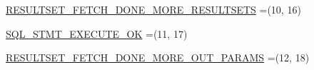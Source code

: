 \begin{DoxyCompactItemize}
\item 
\mbox{\hyperlink{enumcom_1_1mysql_1_1cj_1_1x_1_1protobuf_1_1_mysqlx_1_1_server_messages_1_1_type_adc57e1bc32d9302f82454930a858bb36}{R\+E\+S\+U\+L\+T\+S\+E\+T\+\_\+\+F\+E\+T\+C\+H\+\_\+\+D\+O\+N\+E\+\_\+\+M\+O\+R\+E\+\_\+\+R\+E\+S\+U\+L\+T\+S\+E\+TS}} =(10, 16)
\item 
\mbox{\hyperlink{enumcom_1_1mysql_1_1cj_1_1x_1_1protobuf_1_1_mysqlx_1_1_server_messages_1_1_type_a049c3de5af1b3d185b1502bcf6d161ef}{S\+Q\+L\+\_\+\+S\+T\+M\+T\+\_\+\+E\+X\+E\+C\+U\+T\+E\+\_\+\+OK}} =(11, 17)
\item 
\mbox{\hyperlink{enumcom_1_1mysql_1_1cj_1_1x_1_1protobuf_1_1_mysqlx_1_1_server_messages_1_1_type_a9296015d4c27815c92dcf2ee3410417e}{R\+E\+S\+U\+L\+T\+S\+E\+T\+\_\+\+F\+E\+T\+C\+H\+\_\+\+D\+O\+N\+E\+\_\+\+M\+O\+R\+E\+\_\+\+O\+U\+T\+\_\+\+P\+A\+R\+A\+MS}} =(12, 18)
\end{DoxyCompactItemize}
